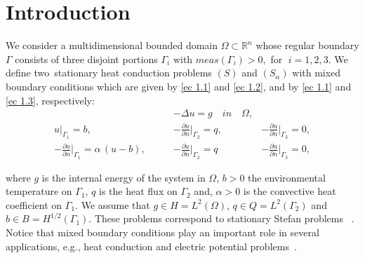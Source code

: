 \documentclass[11pt]{article}
\begin{document}
\section{Introduction}\label{intro}


   We consider a multidimensional bounded domain $\Omega \subset \mathbb{R}^n$ whose regular boundary $\Gamma$  consists of three disjoint portions $\Gamma_i$ with $meas(\Gamma_i) > 0,$ for   $\; i=1, 2, 3$. We define two~stationary heat conduction problems  $(S)$ and $(S_\alpha)$ with mixed boundary conditions which are given by  \eqref{ec 1.1} and \eqref{ec 1.2}, and by \eqref{ec 1.1} and \eqref{ec 1.3}, respectively: %
 \begin{eqnarray}
 & -\Delta u=g   \quad in \quad  \Omega, &  \label{ec 1.1}\\[0.25cm]
 u\Big\vert_{\Gamma_1}=b,\qquad &-\tfrac{\partial u}{\partial n}\Big\vert_{\Gamma_2} =q , \qquad &-\tfrac{\partial u}{\partial n} \Big\vert_{\Gamma_3}=0, \label{ec 1.2}\\[0.25cm]
  -\tfrac{\partial u}{\partial n} \Big\vert_{\Gamma_1}= \alpha\,(u-b),\qquad & -\tfrac{\partial u}{\partial n} \Big\vert_{\Gamma_2}=q \qquad & -\tfrac{\partial u}{\partial n}\Big\vert_{\Gamma_3} =0 ,\label{ec 1.3}
\end{eqnarray}   
 
\noindent where $g$ is the internal energy of the system in $\Omega$, $b>0$ the environmental temperature  on $\Gamma_1$, $q$ is the heat flux on $\Gamma_2$ and, $\alpha>0$ is the convective heat coefficient on $\Gamma_1.$ We assume that $g \in H= L^2(\Omega)$, $q\in Q=L^2(\Gamma_2)$ and $b \in B= H^{1/2}(\Gamma_1).$  These problems correspond to stationary Stefan problems ~\cite{TaTa1989,Ta1996}.
   Notice that mixed boundary conditions play an important role in several applications, e.g., heat conduction and electric potential problems~\cite{HaMe2009}. 
\end{document}
